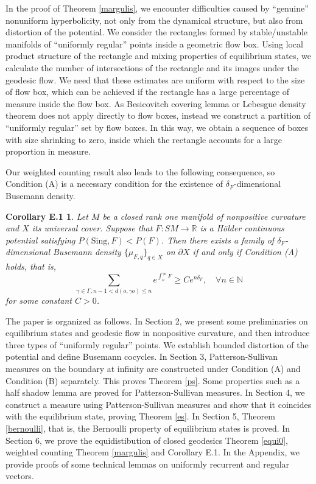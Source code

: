 \documentclass[11pt]{amsart}
\newtheorem*{CorollaryE1}{Corollary E.1}
\theoremstyle{definition}
\def\pX{{\partial X}}
\def\RR{{\mathbb R}}
\def\NN{{\mathbb N}}
\def\c{\gamma}   \def\C{\Gamma}
\def\d{\delta}   %
\begin{document}
In the proof of Theorem \ref{margulis}, we encounter difficulties caused by ``genuine''  nonuniform hyperbolicity, not only from the dynamical structure, but also from distortion of the potential. We consider the rectangles formed by stable/unstable manifolds of ``uniformly regular'' points inside a geometric flow box.  Using local product structure of the rectangle and mixing properties of equilibrium states, we calculate the number of intersections of the rectangle and its images under the geodesic flow. We need that these estimates are uniform with respect to the size of flow box, which can be achieved if the rectangle has a large percentage of measure inside the flow box. As Besicovitch covering lemma or Lebesgue density theorem does not apply directly to flow boxes, instead we construct a partition of ``uniformly regular'' set by flow boxes. In this way, we obtain a sequence of boxes with size shrinking to zero, inside which the rectangle accounts for a large proportion in measure. 

Our weighted counting result also leads to the following consequence, so Condition (A) is a necessary condition for the existence of $\d_F$-dimensional Busemann density.
\begin{CorollaryE1}\label{necessary}
Let $M$ be a closed rank one manifold of nonpositive curvature and $X$ its universal cover. Suppose that $F:SM\to \RR$ is a H\"{o}lder continuous potential satisfying $P(\text{Sing},F)<P(F)$. Then there exists a family of $\d_F$-dimensional Busemann density $\{\mu_{F,q}\}_{q\in X}$ on $\pX$ if and only if Condition (A) holds, that is,
$$\sum_{\c\in \C, n-1< d(o, \c o)\le n}e^{\int_o^{\c o}F}\ge Ce^{n\d_F}, \quad \forall n\in \NN$$
for some constant $C>0$.
\end{CorollaryE1}










The paper is organized as follows. In Section 2, we present some preliminaries on equilibrium states and geodesic flow in nonpositive curvature, and then introduce three types of ``uniformly regular'' points. We establish bounded distortion of the potential and define Busemann cocycles. In Section 3, Patterson-Sullivan measures on the boundary at infinity are constructed under Condition (A) and Condition (B) separately. This proves Theorem \ref{ps}. Some properties such as a half shadow lemma are proved for Patterson-Sullivan measures. In Section 4, we construct a measure using Patterson-Sullivan measures and show that it coincides with the equilibrium state, proving Theorem \ref{es}. In Section 5, Theorem \ref{bernoulli}, that is, the Bernoulli property of equilibrium states is proved. In Section 6, we prove the equidistibution of closed geodesics Theorem \ref{equi0}, weighted counting Theorem \ref{margulis} and Corollary E.1. In the Appendix, we provide proofs of some technical lemmas on uniformly recurrent and regular vectors.
\end{document}
